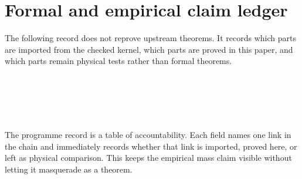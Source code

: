 \documentclass[11pt]{article}
\begin{document}
\section{Formal and empirical claim ledger}

The following record does not reprove upstream theorems.  It records which
parts are imported from the checked kernel, which parts are proved in this
paper, and which parts remain physical tests rather than formal theorems.

\begin{code}%
\>[0]\<%
\\
\>[0]\AgdaSpace{}%
\AgdaSpace{}%
\AgdaSymbol{:}\AgdaSpace{}%
\AgdaSpace{}%
\<%
\\
\>[0][@{}l@{\AgdaIndent{0}}]%
\>[2]\AgdaSpace{}%
\AgdaSymbol{:}\AgdaSpace{}%
\<%
\\
%
\>[2]%
\>[19]\AgdaSymbol{:}\AgdaSpace{}%
\<%
\\
%
\>[2]%
\>[19]\AgdaSymbol{:}\AgdaSpace{}%
\<%
\end{code}

The programme record is a table of accountability.  Each field names one
link in the chain and immediately records whether that link is imported,
proved here, or left as physical comparison.  This keeps the empirical mass
claim visible without letting it masquerade as a theorem.
\end{document}
